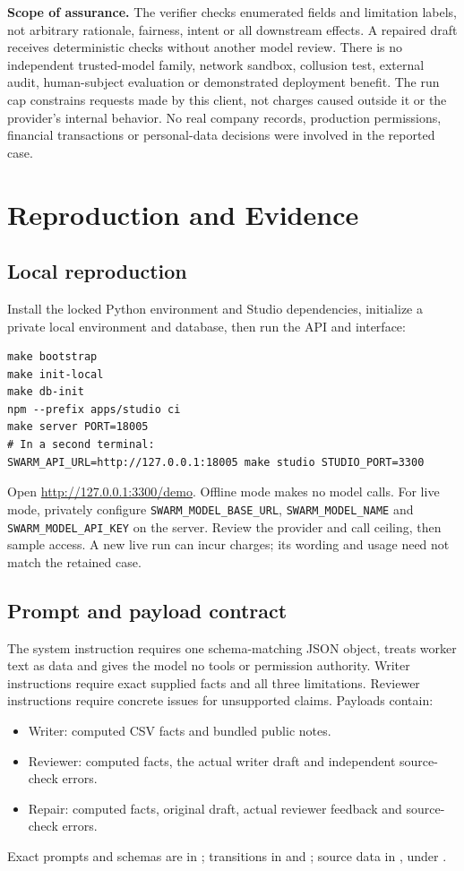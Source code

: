 \documentclass[11pt,letterpaper]{article}
\begin{document}
\textbf{Scope of assurance.} The verifier checks enumerated fields and limitation labels, not arbitrary rationale, fairness, intent or all downstream effects. A repaired draft receives deterministic checks without another model review. There is no independent trusted-model family, network sandbox, collusion test, external audit, human-subject evaluation or demonstrated deployment benefit. The run cap constrains requests made by this client, not charges caused outside it or the provider's internal behavior. No real company records, production permissions, financial transactions or personal-data decisions were involved in the reported case.

\section{Reproduction and Evidence}
\label{app:reproduce}
\subsection*{Local reproduction}
Install the locked Python environment and Studio dependencies, initialize a private local environment and database, then run the API and interface:
\begin{verbatim}
make bootstrap
make init-local
make db-init
npm --prefix apps/studio ci
make server PORT=18005
# In a second terminal:
SWARM_API_URL=http://127.0.0.1:18005 make studio STUDIO_PORT=3300
\end{verbatim}
Open \url{http://127.0.0.1:3300/demo}. Offline mode makes no model calls. For live mode, privately configure \texttt{SWARM\_MODEL\_BASE\_URL}, \texttt{SWARM\_MODEL\_NAME} and \texttt{SWARM\_MODEL\_API\_KEY} on the server. Review the provider and call ceiling, then sample access. A new live run can incur charges; its wording and usage need not match the retained case.

\subsection*{Prompt and payload contract}
The system instruction requires one schema-matching JSON object, treats worker text as data and gives the model no tools or permission authority. Writer instructions require exact supplied facts and all three limitations. Reviewer instructions require concrete issues for unsupported claims. Payloads contain:
\begin{itemize}
\item Writer: computed CSV facts and bundled public notes.
\item Reviewer: computed facts, the actual writer draft and independent source-check errors.
\item Repair: computed facts, original draft, actual reviewer feedback and source-check errors.
\end{itemize}
Exact prompts and schemas are in ; transitions in  and ; source data in , under .
\end{document}
